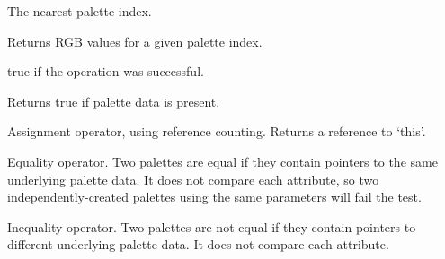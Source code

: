 The nearest palette index.



\label{wxpalettegetrgb}


Returns RGB values for a given palette index.







true if the operation was successful.




\label{wxpaletteok}


Returns true if palette data is present.

\label{wxpaletteassignment}


Assignment operator, using reference counting. Returns a reference
to `this'.

\label{wxpaletteequals}


Equality operator. Two palettes are equal if they contain pointers
to the same underlying palette data. It does not compare each attribute,
so two independently-created palettes using the same parameters will
fail the test.

\label{wxpalettenotequals}


Inequality operator. Two palettes are not equal if they contain pointers
to different underlying palette data. It does not compare each attribute.


